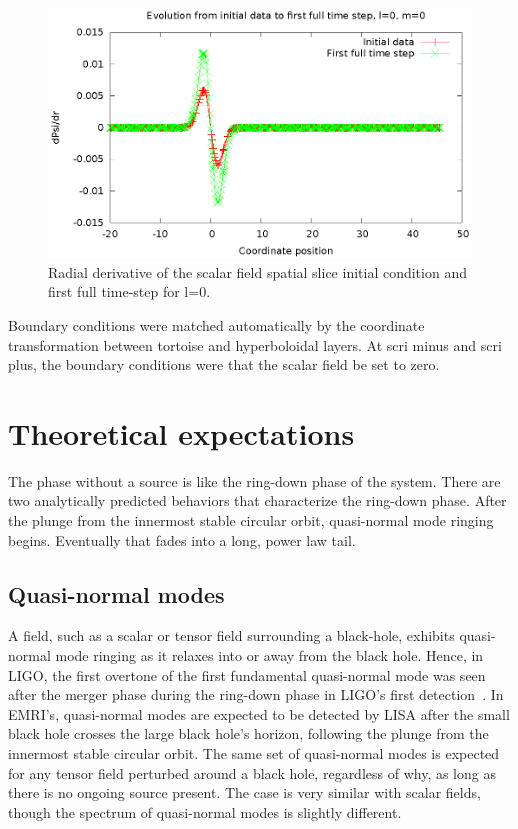 \begin{figure}
  \includegraphics{phi1dl0}
  \caption{Radial derivative of the scalar field spatial slice initial condition and first full time-step for l=0.}
\end{figure}

Boundary conditions were matched automatically by the coordinate transformation between tortoise and hyperboloidal layers. At scri minus and scri plus, the boundary conditions were that the scalar field be set to zero. 

\section{Theoretical expectations}

The phase without a source is like the ring-down phase of the system. There are two analytically predicted behaviors that characterize the ring-down phase. After the plunge from the innermost stable circular orbit, quasi-normal mode ringing begins. Eventually that fades into a long, power law tail.

\subsection{Quasi-normal modes}
A field, such as a scalar or tensor field surrounding a black-hole, exhibits quasi-normal mode ringing as it relaxes into or away from the black hole.  Hence, in LIGO, the first overtone of the first fundamental quasi-normal mode was seen after the merger phase during the ring-down phase in LIGO's first detection~\cite{LIGO1e}. In EMRI's, quasi-normal modes are expected to be detected by LISA after the small black hole crosses the large black hole's horizon, following the plunge from the innermost stable circular orbit. The same set of quasi-normal modes is expected for any tensor field perturbed around a black hole, regardless of why, as long as there is no ongoing source present. The case is very similar with scalar fields, though the spectrum of quasi-normal modes is slightly different.

